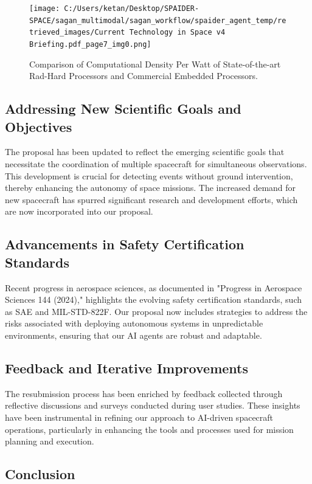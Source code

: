 \documentclass[a4paper, 11pt]{article}
\begin{document}
\begin{figure}[htbp]
    \centering
    \texttt{[image: C:/Users/ketan/Desktop/SPAIDER-SPACE/sagan\_multimodal/sagan\_workflow/spaider\_agent\_temp/retrieved\_images/Current Technology in Space v4 Briefing.pdf\_page7\_img0.png]}
    \caption{Comparison of Computational Density Per Watt of State-of-the-art Rad-Hard Processors and Commercial Embedded Processors.}
    \label{fig:comp-density}
\end{figure}

\subsection{Addressing New Scientific Goals and Objectives}

The proposal has been updated to reflect the emerging scientific goals that necessitate the coordination of multiple spacecraft for simultaneous observations. This development is crucial for detecting events without ground intervention, thereby enhancing the autonomy of space missions. The increased demand for new spacecraft has spurred significant research and development efforts, which are now incorporated into our proposal.

\subsection{Advancements in Safety Certification Standards}

Recent progress in aerospace sciences, as documented in "Progress in Aerospace Sciences 144 (2024)," highlights the evolving safety certification standards, such as SAE and MIL-STD-822F. Our proposal now includes strategies to address the risks associated with deploying autonomous systems in unpredictable environments, ensuring that our AI agents are robust and adaptable.

\subsection{Feedback and Iterative Improvements}

The resubmission process has been enriched by feedback collected through reflective discussions and surveys conducted during user studies. These insights have been instrumental in refining our approach to AI-driven spacecraft operations, particularly in enhancing the tools and processes used for mission planning and execution.

\subsection{Conclusion}
\end{document}
